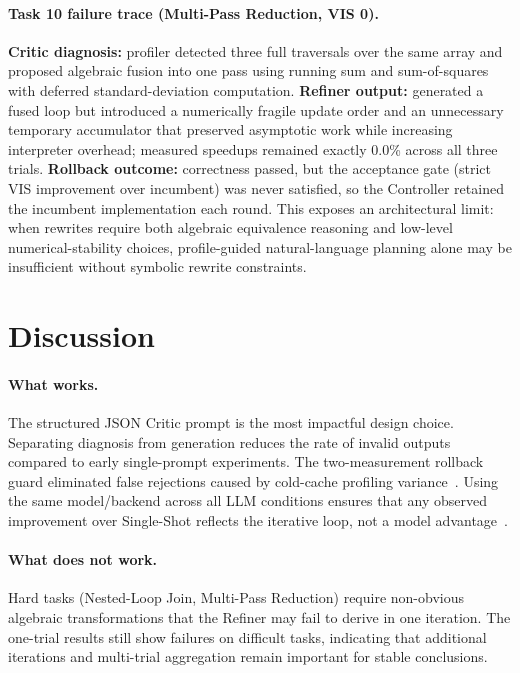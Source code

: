 \documentclass{article}
\begin{document}
\paragraph{Task 10 failure trace (Multi-Pass Reduction, VIS 0).}
\textbf{Critic diagnosis:} profiler detected three full traversals over the same array and proposed algebraic fusion into one pass using running sum and sum-of-squares with deferred standard-deviation computation. \textbf{Refiner output:} generated a fused loop but introduced a numerically fragile update order and an unnecessary temporary accumulator that preserved asymptotic work while increasing interpreter overhead; measured speedups remained exactly 0.0\% across all three trials. \textbf{Rollback outcome:} correctness passed, but the acceptance gate (strict VIS improvement over incumbent) was never satisfied, so the Controller retained the incumbent implementation each round. This exposes an architectural limit: when rewrites require both algebraic equivalence reasoning and low-level numerical-stability choices, profile-guided natural-language planning alone may be insufficient without symbolic rewrite constraints.

\section{Discussion}

\paragraph{What works.}
The structured JSON Critic prompt is the most impactful design choice. Separating diagnosis from generation reduces the rate of invalid outputs compared to early single-prompt experiments. The two-measurement rollback guard eliminated false rejections caused by cold-cache profiling variance~\cite{update2}. Using the same model/backend across all LLM conditions ensures that any observed improvement over Single-Shot reflects the iterative loop, not a model advantage~\cite{update3}.

\paragraph{What does not work.}
Hard tasks (Nested-Loop Join, Multi-Pass Reduction) require non-obvious algebraic transformations that the Refiner may fail to derive in one iteration. The one-trial results still show failures on difficult tasks, indicating that additional iterations and multi-trial aggregation remain important for stable conclusions.
\end{document}
